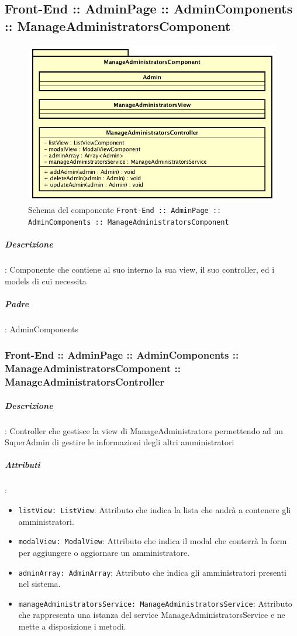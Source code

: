 \documentclass[../ManualeSviluppatore_v1.0.0.tex]{subfiles}
\begin{document}
	\subsection{Front-End :: AdminPage :: AdminComponents :: ManageAdministratorsComponent}
	\begin{figure}[!h]
		\centering
		\includegraphics[scale=0.6]{Architettura/Front-End/AdminPage/AdminComponents/ManageAdministratorsComponent.png}
		\caption{Schema del componente \texttt{Front-End :: AdminPage :: AdminComponents :: ManageAdministratorsComponent}}
	\end{figure}

			\subparagraph{Descrizione}: Componente che contiene al suo interno la sua view, il suo controller, ed i models di cui necessita
			\subparagraph{Padre}: AdminComponents
				\subsubsection{Front-End :: AdminPage :: AdminComponents :: ManageAdministratorsComponent :: ManageAdministratorsController}
		      		\subparagraph{Descrizione}: Controller che gestisce la view di ManageAdministrators permettendo ad un SuperAdmin di gestire le informazioni degli altri amministratori
			      	\subparagraph{Attributi}:
					\begin{itemize}
						\item \texttt{listView: ListView}: Attributo che indica la lista che andrà a contenere gli amministratori.
						\item \texttt{modalView: ModalView}: Attributo che indica il modal che conterrà la form per aggiungere o aggiornare un amministratore.
						\item \texttt{adminArray: AdminArray}: Attributo che indica gli amministratori presenti nel sistema.
						\item \texttt{manageAdministratorsService: ManageAdministratorsService}: Attributo che rappresenta una istanza del service ManageAdministratorsService e ne mette a disposizione i metodi.
					\end{itemize}
\end{document}
